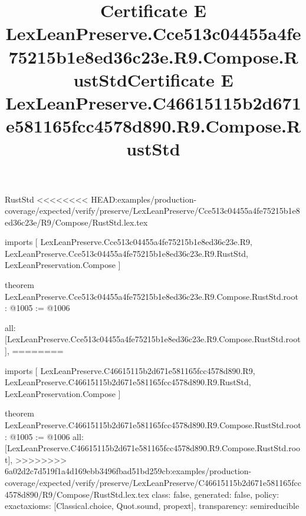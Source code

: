 \begin{lexlean}{RustStd}
<<<<<<<< HEAD:examples/production-coverage/expected/verify/preserve/LexLeanPreserve/Cce513c04455a4fe75215b1e8ed36c23e/R9/Compose/RustStd.lex.tex
\title{Certificate E LexLeanPreserve.Cce513c04455a4fe75215b1e8ed36c23e.R9.Compose.RustStd}
\begin{coremodule}
imports [
  LexLeanPreserve.Cce513c04455a4fe75215b1e8ed36c23e.R9,
  LexLeanPreserve.Cce513c04455a4fe75215b1e8ed36c23e.R9.RustStd,
  LexLeanPreservation.Compose
]

theorem LexLeanPreserve.Cce513c04455a4fe75215b1e8ed36c23e.R9.Compose.RustStd.root : @1005 := @1006 {
  all: [LexLeanPreserve.Cce513c04455a4fe75215b1e8ed36c23e.R9.Compose.RustStd.root],
========
\title{Certificate E LexLeanPreserve.C46615115b2d671e581165fcc4578d890.R9.Compose.RustStd}
\begin{coremodule}
imports [
  LexLeanPreserve.C46615115b2d671e581165fcc4578d890.R9,
  LexLeanPreserve.C46615115b2d671e581165fcc4578d890.R9.RustStd,
  LexLeanPreservation.Compose
]

theorem LexLeanPreserve.C46615115b2d671e581165fcc4578d890.R9.Compose.RustStd.root : @1005 := @1006 {
  all: [LexLeanPreserve.C46615115b2d671e581165fcc4578d890.R9.Compose.RustStd.root],
>>>>>>>> 6a02d2c7d519f1a4d169ebb3496fbad51bd259cb:examples/production-coverage/expected/verify/preserve/LexLeanPreserve/C46615115b2d671e581165fcc4578d890/R9/Compose/RustStd.lex.tex
  class: false,
  generated: false,
  policy: exact{axioms: [Classical.choice, Quot.sound, propext]},
  transparency: semireducible
}


\end{coremodule}}
\end{coremodule}
\end{lexlean}
